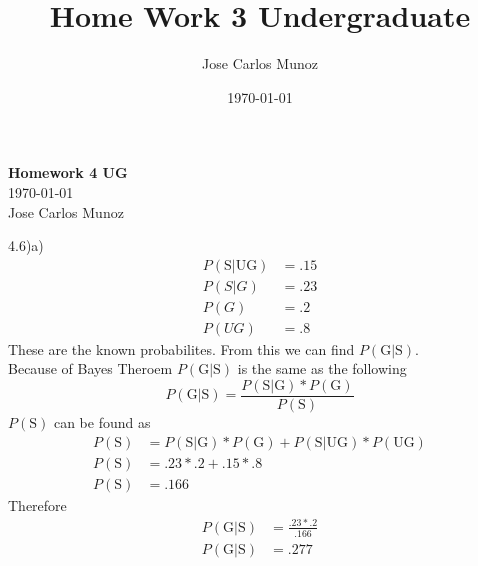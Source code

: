 \documentclass[12pt,english]{article}
\title{Home Work 3 Undergraduate}
\date{\today}
\author{Jose Carlos Munoz}
\begin{document}
\begin{center}
    \Large
    \textbf{Homework 4 UG}\\
    \small
    \today\\
    \large
    Jose Carlos Munoz
\end{center}%
4.6)a)\\
\begin{equation}\tag{1}\label{eq:1}
\begin{split}
P(\mbox{S}\vert \mbox{UG}) &= .15 \\
P(S\vert G) &= .23\\
P(G) &= .2\\
P(UG) &= .8
\end{split}
\end{equation}
These are the known probabilites. From this we can find $P(\mbox{G}\vert \mbox{S})$.\\
Because of Bayes Theroem  $P(\mbox{G}\vert \mbox{S})$ is the same as the following
\begin{equation}
P(\mbox{G}\vert \mbox{S}) = \frac{P(\mbox{S} \vert \mbox{G}) * P(\mbox{G})}{P(\mbox{S})}
\end{equation}
$P(\mbox{S})$ can be found as
\begin{equation}
\begin{split}
P(\mbox{S}) &=  P(\mbox{S} \vert \mbox{G}) * P(\mbox{G}) + P(\mbox{S} \vert \mbox{UG}) * P(\mbox{UG})\\
P(\mbox{S}) &= .23 *.2 + .15 * .8\\
P(\mbox{S}) &=.166
\end{split}
\end{equation}
Therefore
\begin{equation}
\begin{split}
P(\mbox{G}\vert \mbox{S}) &= \frac{.23 * .2}{.166}\\
P(\mbox{G}\vert \mbox{S}) &= .277\\
\end{split}
\end{equation}
\end{document}
